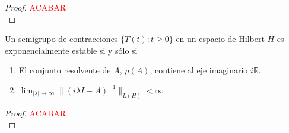 \begin{proof}
    \textcolor{red}{ACABAR}\\
\end{proof}

\begin{Teorema}
    \label{ch:semigrupos:section:estExp:th:estExpHilbert}

    Un semigrupo de contracciones $\{T(t) : t \geq 0 \}$ en un espacio de Hilbert $H$ es exponencialmente estable si y sólo si

    \begin{enumerate}
        \item El conjunto resolvente de $A$, $\rho(A)$, contiene al eje imaginario $i\mathbb{R}$.

        \item $\displaystyle\lim_{\lvert \lambda \lvert \rightarrow \infty}\lVert (i\lambda I - A)^{-1}\rVert_{L(H)} < \infty$
    \end{enumerate}
\end{Teorema}

\begin{proof}
    \textcolor{red}{ACABAR}\\
\end{proof}